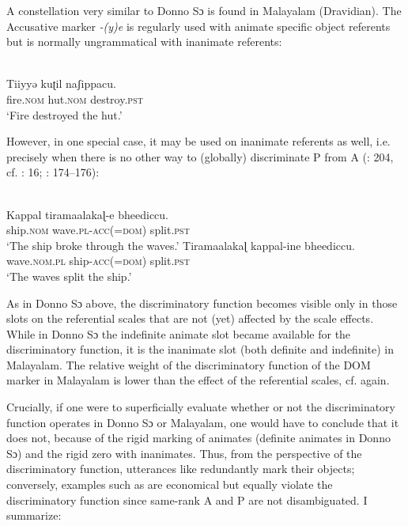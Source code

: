 \documentclass[output=paper]{langsci/langscibook}
\begin{document}
A constellation very similar to Donno Sɔ is found in Malayalam (Dravidian). The Accusative marker \textit{{}-(y)e} is regularly used with animate specific object referents but is normally ungrammatical with inanimate referents: 

\ea\label{ex:serzant:10}
\\
\gll Tiiyyǝ       kuʈil   naʃippacu.\\
     fire.\textsc{nom}  hut.\textsc{nom}   destroy.\textsc{pst}\\
\glt ‘Fire destroyed the hut.’
\z

However, in one special case, it may be used on inanimate referents as well, i.e. precisely when there is no other way to (globally) discriminate P from A (\citealt{AsherKumari1997}: 204, cf. \citealt{Stiebels2002}: 16; \citealt{Subbārāo2012}: 174\-–176):

\ea\label{ex:serzant:11}
\\
\ea
\gll Kappal   tiramaalakaɭ{}-e   bheediccu.\\
     ship.\textsc{nom}   wave.\textsc{pl-acc(=dom)}  split.\textsc{pst}\\
\glt ‘The ship broke through the waves.’
\ex
\gll Tiramaalakaɭ kappal-ine     bheediccu.\\
     wave.\textsc{nom.pl}     ship-\textsc{acc(=dom)}   split.\textsc{pst}\\
\glt ‘The waves split the ship.’
\z
\z

As in Donno Sɔ above, the discriminatory function becomes visible only in those slots on the referential scales that are not (yet) affected by the scale effects. While in Donno Sɔ the indefinite animate slot became available for the discriminatory function, it is the inanimate slot (both definite and indefinite) in Malayalam. The relative weight of the discriminatory function of the DOM marker in Malayalam is lower than the effect of the referential scales, cf.  again. 

Crucially, if one were to superficially evaluate whether or not the discriminatory function operates in Donno Sɔ or Malayalam, one would have to conclude that it does not, because of the rigid marking of animates (definite animates in Donno Sɔ) and the rigid zero with inanimates. Thus, from the perspective of the discriminatory function, utterances like  redundantly mark their objects; conversely, examples such as  are economical but equally violate the discriminatory function since same-rank A and P are not disambiguated. I summarize:
\end{document}
